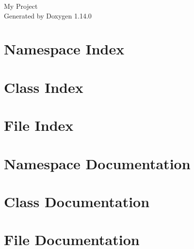 \documentclass[twoside]{book}
\newcommand{\+}{\discretionary{\mbox{\scriptsize$\hookleftarrow$}}{}{}}
\newcommand{\clearemptydoublepage}{%
    \newpage{\pagestyle{empty}\cleardoublepage}%
  }
\begin{document}
  \raggedbottom
    \hypersetup{pageanchor=false,
                bookmarksnumbered=true,
                pdfencoding=unicode
               }
  \begin{titlepage}
  \vspace*{7cm}
  \begin{center}%
  {\Large My Project}\\
  \vspace*{1cm}
  {\large Generated by Doxygen 1.14.0}\\
  \end{center}
  \end{titlepage}
  \clearemptydoublepage
  \tableofcontents
  \clearemptydoublepage
  \hypersetup{pageanchor=true}

\chapter{Namespace Index}

\chapter{Class Index}

\chapter{File Index}

\chapter{Namespace Documentation}









\chapter{Class Documentation}



\chapter{File Documentation}


  \backmatter
  \newpage
  \clearemptydoublepage
  \printindex
\end{document}
